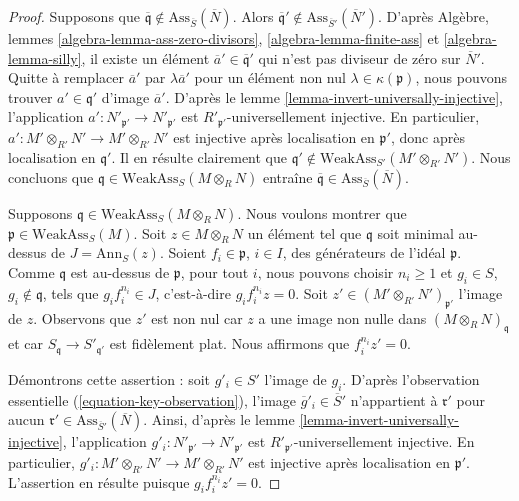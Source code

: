 \begin{proof}
\medskip\noindent
Supposons que
$\overline{\mathfrak q} \not \in \text{Ass}_{\overline{S}}(\overline{N})$.
Alors
$\overline{\mathfrak q}' \not \in \text{Ass}_{\overline{S}'}(\overline{N}')$.
D'après
Algèbre, lemmes \ref{algebra-lemma-ass-zero-divisors},
\ref{algebra-lemma-finite-ass} et
\ref{algebra-lemma-silly},
il existe un élément $\overline{a}' \in \overline{\mathfrak q}'$
qui n'est pas diviseur de zéro sur $\overline{N}'$.
Quitte à remplacer $\overline{a}'$ par $\lambda \overline{a}'$ pour un élément non nul
$\lambda \in \kappa(\mathfrak p)$, nous pouvons trouver
$a' \in \mathfrak q'$ d'image $\overline{a}'$. D'après le
lemme \ref{lemma-invert-universally-injective},
l'application $a' : N'_{\mathfrak p'} \to N'_{\mathfrak p'}$ est
$R'_{\mathfrak p'}$-universellement injective. En particulier,
$a' : M' \otimes_{R'} N' \to M' \otimes_{R'} N'$ est
injective après localisation en $\mathfrak p'$, donc après
localisation en $\mathfrak q'$. Il en résulte clairement que
$\mathfrak q' \not \in \text{WeakAss}_{S'}(M' \otimes_{R'} N')$.
Nous concluons que $\mathfrak q \in \text{WeakAss}_S(M \otimes_R N)$ entraîne
$\overline{\mathfrak q} \in \text{Ass}_{\overline{S}}(\overline{N})$.

\medskip\noindent
Supposons $\mathfrak q \in \text{WeakAss}_S(M \otimes_R N)$. Nous voulons
montrer que $\mathfrak p \in \text{WeakAss}_S(M)$.
Soit $z \in M \otimes_R N$ un élément tel que $\mathfrak q$
soit minimal au-dessus de $J = \text{Ann}_S(z)$.
Soient $f_i \in \mathfrak p$, $i \in I$, des générateurs de
l'idéal $\mathfrak p$. Comme $\mathfrak q$ est au-dessus de $\mathfrak p$, pour tout $i$,
nous pouvons choisir $n_i \geq 1$ et $g_i \in S$, $g_i \not \in \mathfrak q$,
tels que $g_i f_i^{n_i} \in J$, c'est-à-dire $g_i f_i^{n_i} z = 0$.
Soit $z' \in (M' \otimes_{R'} N')_{\mathfrak p'}$ l'image de $z$.
Observons que $z'$ est non nul car $z$ a une image non nulle dans
$(M \otimes_R N)_\mathfrak q$ et car $S_\mathfrak q \to S'_{\mathfrak q'}$
est fidèlement plat. Nous affirmons que $f_i^{n_i} z' = 0$.

\medskip\noindent
Démontrons cette assertion : soit $g'_i \in S'$ l'image de $g_i$.
D'après l'observation essentielle (\ref{equation-key-observation}),
l'image $\overline{g}'_i \in \overline{S}'$
n'appartient à $\mathfrak r'$ pour aucun
$\mathfrak r' \in \text{Ass}_{\overline{S}'}(\overline{N})$.
Ainsi, d'après le lemme \ref{lemma-invert-universally-injective},
l'application $g'_i : N'_{\mathfrak p'} \to N'_{\mathfrak p'}$ est
$R'_{\mathfrak p'}$-universellement injective. En particulier,
$g'_i : M' \otimes_{R'} N' \to M' \otimes_{R'} N'$ est
injective après localisation en $\mathfrak p'$. L'assertion
en résulte puisque $g_i f_i^{n_i} z' = 0$.


\end{proof}
